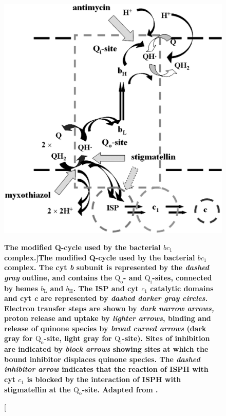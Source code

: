 \begin{figure}[tbp]
	\begin{center}
		\includegraphics[width=14cm]{01-introduction/data/q-cycle.png}
	\caption[\bf The modified Q-cycle used by the bacterial $bc_1$ complex.]{{\bf The modified Q-cycle used by the bacterial $bc_1$ complex.}  The cyt \textit{b} subunit is represented by the \textit{dashed gray} outline, and contains the $\mathrm{Q}_\mathrm{o}$- and $\mathrm{Q}_\mathrm{i}$-sites, connected by hemes $b_\mathrm{L}$ and $b_\mathrm{H}$. The ISP and cyt $c_1$ catalytic domains and cyt \textit{c} are represented by \textit{dashed darker gray circles}. Electron transfer steps are shown by \textit{dark narrow arrows,} proton release and uptake by \textit{lighter arrows}, binding and release of quinone species by \textit{broad curved arrows} (dark gray for $\mathrm{Q}_\mathrm{o}$-site, light gray for $\mathrm{Q}_\mathrm{i}$-site). Sites of inhibition are indicated by \textit{block arrows} showing sites at which the bound inhibitor displaces quinone species. The \textit{dashed inhibitor arrow} indicates that the reaction of ISPH with cyt $c_1$ is blocked by the interaction of ISPH with stigmatellin at the $\mathrm{Q}_\mathrm{o}$-site. Adapted from \citet{Crofts2003}.
	\label{fig:q-cycle}}
	\end{center}
\end{figure}

